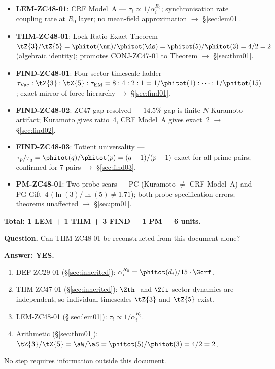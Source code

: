 \documentclass[12pt, a4paper]{article}
\begin{document}

\begin{formalbox}[title={Atomic Units Introduced by ZC48 (6 units)}]
\begin{itemize}[leftmargin=*, noitemsep]
  \item \textbf{LEM-ZC48-01}: CRF Model~A ---
    $\tau_i \propto 1/\alpha_i^{R_0}$;
    synchronisation rate $=$ coupling rate at $R_0$ layer;
    no mean-field approximation
    $\to$ \S\ref{sec:lem01}.
  \item \textbf{THM-ZC48-01}: Lock-Ratio Exact Theorem ---
    $\tZ{3}/\tZ{5} = \phitot(\nm)/\phitot(\ds)
    = \phitot(5)/\phitot(3) = 4/2 = 2$ (algebraic identity);
    promotes CONJ-ZC47-01 to Theorem
    $\to$ \S\ref{sec:thm01}.
  \item \textbf{FIND-ZC48-01}: Four-sector timescale ladder ---
    $\tau_{\rm Vac} : \tZ{3} : \tZ{5} : \tau_{\rm EM}
    = 8 : 4 : 2 : 1 = 1/\phitot(1) : \cdots : 1/\phitot(15)$;
    exact mirror of force hierarchy
    $\to$ \S\ref{sec:find01}.
  \item \textbf{FIND-ZC48-02}: ZC47 gap resolved ---
    $14.5\%$ gap is finite-$N$ Kuramoto artifact;
    Kuramoto gives ratio~4, CRF Model~A gives exact~2
    $\to$ \S\ref{sec:find02}.
  \item \textbf{FIND-ZC48-03}: Totient universality ---
    $\tau_p/\tau_q = \phitot(q)/\phitot(p) = (q-1)/(p-1)$
    exact for all prime pairs; confirmed for 7 pairs
    $\to$ \S\ref{sec:find03}.
  \item \textbf{PM-ZC48-01}: Two probe scars ---
    PC (Kuramoto $\neq$ CRF Model~A)
    and PG Gift~4 ($\ln(3)/\ln(5) \neq 1.71$);
    both probe specification errors; theorems unaffected
    $\to$ \S\ref{sec:pm01}.
\end{itemize}
\textbf{Total: 1 LEM + 1 THM + 3 FIND + 1 PM = 6 units.}
\end{formalbox}

\begin{formalbox}[title={Reconstruction Test (CUIP No-Loss)}]
\textbf{Question.}
Can THM-ZC48-01 be reconstructed from this document alone?

\textbf{Answer: YES.}
\begin{enumerate}[leftmargin=*, noitemsep]
  \item DEF-ZC29-01 (\S\ref{sec:inherited}):
    $\alpha_i^{R_0} = \phitot(d_i)/15\cdot\Gcrf$.
  \item THM-ZC47-01 (\S\ref{sec:inherited}):
    $\Zth$- and $\Zfi$-sector dynamics are independent,
    so individual timescales $\tZ{3}$ and $\tZ{5}$ exist.
  \item LEM-ZC48-01 (\S\ref{sec:lem01}):
    $\tau_i \propto 1/\alpha_i^{R_0}$.
  \item Arithmetic (\S\ref{sec:thm01}):
    $\tZ{3}/\tZ{5}
    = \aW/\aS
    = \phitot(5)/\phitot(3) = 4/2 = 2$.
\end{enumerate}
No step requires information outside this document.
\end{formalbox}
\end{document}
